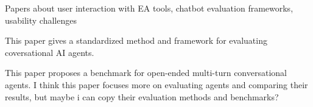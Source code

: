 Papers about user interaction with EA tools, chatbot evaluation frameworks, usability challenges

This paper \cite{evaluationFrameworkLLMs} gives a standardized method and framework for evaluating coversational AI agents.

This paper \cite{liu2023agentbench} proposes a benchmark for open-ended multi-turn conversational agents. I think this paper focuses more on evaluating agents and comparing their results, but maybe i can copy their evaluation methods and benchmarks?







